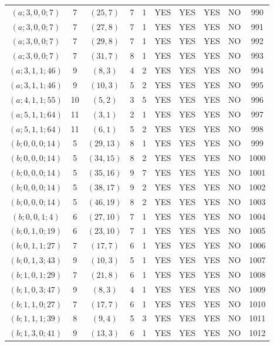 \begin{longtable}{|c|c|c|c|c|c|c|c|c|c|}
$(a; 3, 0, 0; 7)$ & 7 & $(25, 7)$ & 7 & 1 & YES & YES & YES & NO & 990\\
$(a; 3, 0, 0; 7)$ & 7 & $(27, 8)$ & 7 & 1 & YES & YES & YES & NO & 991\\
$(a; 3, 0, 0; 7)$ & 7 & $(29, 8)$ & 7 & 1 & YES & YES & YES & NO & 992\\
$(a; 3, 0, 0; 7)$ & 7 & $(31, 7)$ & 8 & 1 & YES & YES & YES & NO & 993\\
$(a; 3, 1, 1; 46)$ & 9 & $(8, 3)$ & 4 & 2 & YES & YES & YES & NO & 994\\
$(a; 3, 1, 1; 46)$ & 9 & $(10, 3)$ & 5 & 2 & YES & YES & YES & NO & 995\\
$(a; 4, 1, 1; 55)$ & 10 & $(5, 2)$ & 3 & 5 & YES & YES & YES & NO & 996\\
$(a; 5, 1, 1; 64)$ & 11 & $(3, 1)$ & 2 & 1 & YES & YES & YES & NO & 997\\
$(a; 5, 1, 1; 64)$ & 11 & $(6, 1)$ & 5 & 2 & YES & YES & YES & NO & 998\\
$(b; 0, 0, 0; 14)$ & 5 & $(29, 13)$ & 8 & 1 & YES & YES & YES & NO & 999\\
$(b; 0, 0, 0; 14)$ & 5 & $(34, 15)$ & 8 & 2 & YES & YES & YES & NO & 1000\\
$(b; 0, 0, 0; 14)$ & 5 & $(35, 16)$ & 9 & 7 & YES & YES & YES & NO & 1001\\
$(b; 0, 0, 0; 14)$ & 5 & $(38, 17)$ & 9 & 2 & YES & YES & YES & NO & 1002\\
$(b; 0, 0, 0; 14)$ & 5 & $(46, 19)$ & 8 & 2 & YES & YES & YES & NO & 1003\\
$(b; 0, 0, 1; 4)$ & 6 & $(27, 10)$ & 7 & 1 & YES & YES & YES & NO & 1004\\
$(b; 0, 1, 0; 19)$ & 6 & $(23, 10)$ & 7 & 1 & YES & YES & YES & NO & 1005\\
$(b; 0, 1, 1; 27)$ & 7 & $(17, 7)$ & 6 & 1 & YES & YES & YES & NO & 1006\\
$(b; 0, 1, 3; 43)$ & 9 & $(10, 3)$ & 5 & 1 & YES & YES & YES & NO & 1007\\
$(b; 1, 0, 1; 29)$ & 7 & $(21, 8)$ & 6 & 1 & YES & YES & YES & NO & 1008\\
$(b; 1, 0, 3; 47)$ & 9 & $(8, 3)$ & 4 & 1 & YES & YES & YES & NO & 1009\\
$(b; 1, 1, 0; 27)$ & 7 & $(17, 7)$ & 6 & 1 & YES & YES & YES & NO & 1010\\
$(b; 1, 1, 1; 39)$ & 8 & $(9, 4)$ & 5 & 3 & YES & YES & YES & NO & 1011\\
$(b; 1, 3, 0; 41)$ & 9 & $(13, 3)$ & 6 & 1 & YES & YES & YES & NO & 1012\\

\end{longtable}
